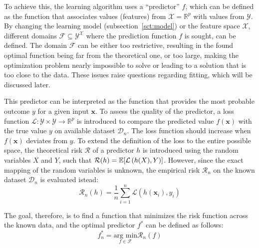 \documentclass[main]{subfiles}
\begin{document}
To achieve this, the learning algorithm uses a ``predictor'' $f$, which can be defined as the function that associates values (features) from $\mathcal{X}=\mathbb{R}^{p}$ with values from $\mathcal{Y}$. By changing the learning model (subsection~\ref{sct:model}) or the feature space $\mathcal{X}$, different domains $\mathcal{F}\subseteq{\mathcal{Y}}^{\mathcal{X}}$ where the prediction function $f$ is sought, can be defined. The domain $\mathcal{F}$ can be either too restrictive, resulting in the found optimal function being far from the theoretical one, or too large, making the optimization problem nearly impossible to solve or leading to a solution that is too close to the data. These issues raise questions regarding fitting, which will be discussed later.

This predictor can be interpreted as the function that provides the most probable outcome $y$ for a given input $\mathbf{x}$. To assess the quality of the predictor, a loss function $\mathcal{L}:\mathcal{Y}\times\mathcal{Y} \rightarrow \mathbb{R}^{p}$ is introduced to compare the predicted value $f(\mathbf{x})$ with the true value $y$ on available dataset $\mathcal{D}_{n}$. The loss function should increase when $f(\mathbf{x})$ deviates from $y$. To extend the definition of the loss to the entire possible space, the theoretical risk $\mathcal{R}$ of a predictor $h$ is introduced using the random variables $X$ and $Y$, such that $\mathcal{R}(h) = \mathbb{E}{\left[\mathcal{L}\left(h(X),Y\right)\right]}$. However, since the exact mapping of the random variables is unknown, the empirical risk $\mathcal{R}_n$ on the known dataset $\mathcal{D}_{n}$ is evaluated istead:
\begin{equation}\label{eq:risk}
  \mathcal{R}_n(h) = \frac{1}{n}\sum_{i=1}^n \mathcal{L}\left(h(\mathbf{x}_i),y_i\right)
\end{equation}

The goal, therefore, is to find a function that minimizes the risk function across the known data, and the optimal predictor $f^*$ can be defined as follows:
\begin{equation}\label{eq:min_f}
  f_n^* = \underset{f\in\mathcal{F}}{\text{arg min}} \mathcal{R}_n(f)
\end{equation}
\end{document}
